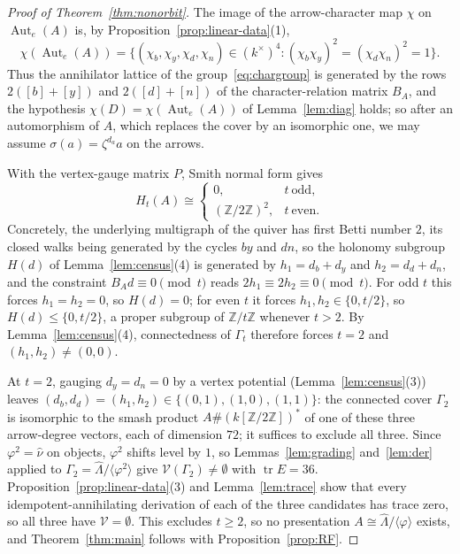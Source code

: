 \documentclass[11pt]{amsart}
\theoremstyle{plain}
\theoremstyle{definition}
\DeclareMathOperator{\tr}{tr}
\DeclareMathOperator{\Aut}{Aut}
\newcommand{\rep}{\widehat{\Lambda}}
\newcommand{\Nak}{\widehat{\nu}}
\newcommand{\cV}{\mathcal{V}}
\newcommand{\ZZ}{\mathbb{Z}}
\begin{document}
\begin{proof}[Proof of Theorem~\ref{thm:nonorbit}]
The image of the arrow-character map $\chi$ on $\Aut_e(A)$ is, by Proposition~\ref{prop:linear-data}(1),
\begin{equation}\label{eq:chargroup}
  \chi(\Aut_e(A))=\{(\chi_b,\chi_y,\chi_d,\chi_n)\in(k^\times)^4 : (\chi_b\chi_y)^2=(\chi_d\chi_n)^2=1\}.
\end{equation}
Thus the annihilator lattice of the group~\eqref{eq:chargroup} is generated by the rows $2([b]+[y])$ and
$2([d]+[n])$ of the character-relation matrix $B_A$, and the hypothesis $\chi(D)=\chi(\Aut_e(A))$ of
Lemma~\ref{lem:diag} holds; so after an automorphism of $A$, which replaces the cover by an isomorphic one, we
may assume $\sigma(a)=\zeta^{d_a}a$ on the arrows.

With the vertex-gauge matrix $P$, Smith normal form gives
\[
  H_t(A)\cong\begin{cases}0, & t\ \text{odd},\\[2pt](\ZZ/2\ZZ)^2, & t\ \text{even}.\end{cases}
\]
Concretely, the underlying multigraph of the quiver has first Betti number $2$, its closed walks being
generated by the cycles $by$ and $dn$, so the holonomy subgroup $H(d)$ of Lemma~\ref{lem:census}(4) is
generated by $h_1=d_b+d_y$ and $h_2=d_d+d_n$, and the constraint $B_Ad\equiv0\pmod t$ reads $2h_1\equiv
2h_2\equiv0\pmod t$. For odd $t$ this forces $h_1=h_2=0$, so $H(d)=0$; for even $t$ it forces
$h_1,h_2\in\{0,t/2\}$, so $H(d)\le\{0,t/2\}$, a proper subgroup of $\ZZ/t\ZZ$ whenever $t>2$. By
Lemma~\ref{lem:census}(4), connectedness of $\Gamma_t$ therefore forces $t=2$ and $(h_1,h_2)\neq(0,0)$.

At $t=2$, gauging $d_y=d_n=0$ by a vertex potential (Lemma~\ref{lem:census}(3)) leaves
$(d_b,d_d)=(h_1,h_2)\in\{(0,1),(1,0),(1,1)\}$: the connected cover $\Gamma_2$ is isomorphic to the smash
product $A\#(k[\ZZ/2\ZZ])^{\ast}$ of one of these three arrow-degree vectors, each of dimension $72$; it
suffices to exclude all three. Since $\varphi^2=\Nak$ on objects, $\varphi^2$ shifts level by $1$, so
Lemmas~\ref{lem:grading} and~\ref{lem:der} applied to $\Gamma_2=\rep/\langle\varphi^2\rangle$ give
$\cV(\Gamma_2)\neq\emptyset$ with $\tr E=36$. Proposition~\ref{prop:linear-data}(3) and Lemma~\ref{lem:trace}
show that every idempotent-annihilating derivation of each of the three candidates has trace zero, so all
three have $\cV=\emptyset$. This excludes $t\ge 2$, so no presentation $A\cong\rep/\langle\varphi\rangle$
exists, and Theorem~\ref{thm:main} follows with Proposition~\ref{prop:RF}.
\end{proof}
\end{document}
